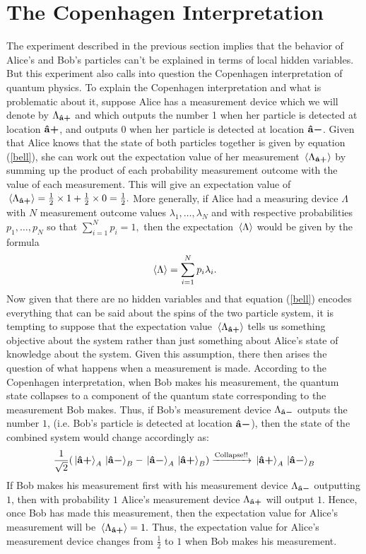 \documentclass[letter, 12pt]{turabian-thesis}
\theoremstyle{hypothesis}
\newcommand{\uvb}[1]{\vb{\hat{{#1}}}}
\newcommand{\uvbp}[1]{\uvb{#1}\bm{+}}
\newcommand{\uvbm}[1]{\uvb{#1}\bm{-}}
\begin{document}
\section{The Copenhagen Interpretation}
 The experiment described in the previous section implies that the behavior of Alice's and Bob's particles can't be explained in terms of local hidden variables. But this experiment also calls into question the Copenhagen interpretation of quantum physics. To explain the Copenhagen interpretation and what is problematic about it, suppose Alice has a measurement device which we will denote by $\Lambda_{\uvbp{a}}$\label{Lambdaa} and which outputs the number 1 when her particle is detected at location $\uvbp{a}$, and outputs 0 when her particle is detected at location $\uvbm{a}$. Given that Alice knows that the state of both particles together is given by equation (\ref{bell}), she can work out the expectation value of her measurement $\ev*{\Lambda_{\uvbp{a}}}$ by summing up the product of each probability measurement outcome with the value of each measurement. This will give an expectation value of $\ev*{\Lambda_{\uvbp{a}}}=\frac{1}{2}\times 1 + \frac{1}{2}\times 0 = \frac{1}{2}.$ More generally, if Alice had a measuring device $\Lambda$ with $N$ measurement outcome values $\lambda_1,\ldots,\lambda_N$ and with respective probabilities $p_1,\ldots,p_N$ so that $\sum_{i=1}^N p_i=1,$ then the expectation $\ev*{\Lambda}$ would be given by the formula
\begin{equation}\label{expectation}\ev*{\Lambda} =\sum_{i=1}^N p_i\lambda_i.
\end{equation}
Now given that there are no hidden variables and that equation (\ref{bell}) encodes everything that can be said about the spins of the two particle system, it is tempting to suppose that the expectation value $\ev*{\Lambda_{\uvbp{a}}}$ tells us something objective about the system rather than just something about Alice's state of knowledge about the system.  Given this assumption, there then arises the question of what happens when a measurement is made. According to the Copenhagen interpretation, when Bob makes his measurement, the quantum state collapses to a component of the quantum state corresponding to the measurement Bob makes. Thus, if Bob's measurement device $\Lambda_{\uvbm{a}}$ outputs the number $1$, (i.e. Bob's particle is detected at location $\uvbm{a}$), then the state of the combined system would change accordingly as:
$$\frac{1}{\sqrt{2}}(\ket*{\uvbp{a}}_A\ket*{\uvbm{a}}_B-\ket*{\uvbm{a}}_A\ket*{\uvbp{a}}_B)\xrightarrow{\text{Collapse!!}}\ket*{\uvbp{a}}_A\ket*{\uvbm{a}}_B $$
If Bob makes his measurement first with his measurement device $\Lambda_{\uvbm{a}}$  outputting $1$, then with probability $1$ Alice's measurement device $\Lambda_{\uvbp{a}}$ will output $1$. Hence, once Bob has made this measurement, then the expectation value for Alice's measurement will be $\ev*{\Lambda_{\uvbp{a}}}=1.$ Thus, the expectation value for Alice's measurement device changes from $\frac{1}{2}$ to $1$ when Bob makes his measurement.
 
\end{document}
